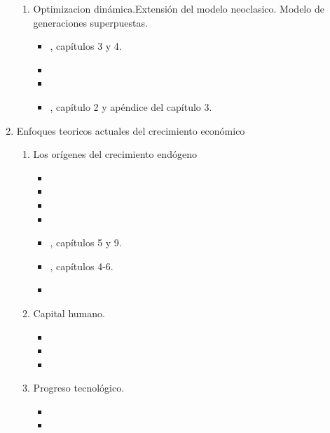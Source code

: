 \documentclass[10pt,a4paper]{article}
\begin{document}
\begin{enumerate}
\begin{enumerate}
			\item Optimizacion dinámica.Extensión del modelo neoclasico. Modelo de generaciones superpuestas.
			 	\begin{itemize}
					\item {}, capítulos 3 y 4.
					\item {}
					\item {}
					\item {}, capítulo 2 y apéndice del capítulo 3.
				\end{itemize}
		\end{enumerate}
	\item Enfoques teoricos actuales del crecimiento económico
		\begin{enumerate}
			\item Los orígenes del crecimiento endógeno
			 	\begin{itemize}
 					\item {}
					\item {}
					\item {}
					\item {}
					\item {}, capítulos 5 y 9.
					\item {}, capítulos 4-6.
					\item {}				
				\end{itemize}
			\item Capital humano.
				\begin{itemize}
					\item {}
 					\item {}
					\item {}
				\end{itemize}
			\item Progreso tecnológico.
 				\begin{itemize}
 					\item {}
					\item {}
				\end{itemize}

\end{enumerate}
\end{enumerate}
\end{document}
